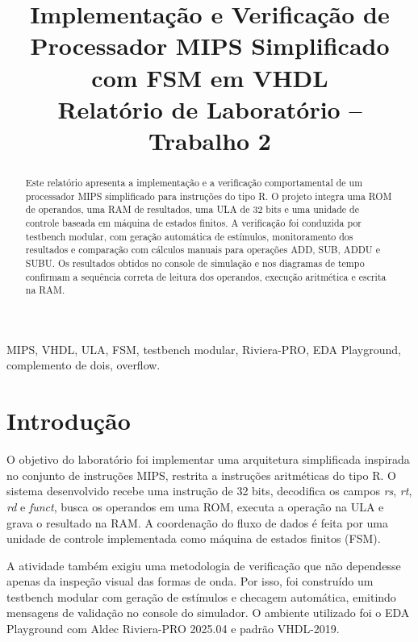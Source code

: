\documentclass[conference]{IEEEtran}
\begin{document}
\title{Implementação e Verificação de Processador MIPS Simplificado com FSM em VHDL\\
{\footnotesize Relatório de Laboratório -- Trabalho 2}}

\author{
}

\maketitle

\begin{abstract}
Este relatório apresenta a implementação e a verificação comportamental de um processador MIPS simplificado para instruções do tipo R. O projeto integra uma ROM de operandos, uma RAM de resultados, uma ULA de 32 bits e uma unidade de controle baseada em máquina de estados finitos. A verificação foi conduzida por testbench modular, com geração automática de estímulos, monitoramento dos resultados e comparação com cálculos manuais para operações ADD, SUB, ADDU e SUBU. Os resultados obtidos no console de simulação e nos diagramas de tempo confirmam a sequência correta de leitura dos operandos, execução aritmética e escrita na RAM.
\end{abstract}

\begin{IEEEkeywords}
MIPS, VHDL, ULA, FSM, testbench modular, Riviera-PRO, EDA Playground, complemento de dois, overflow.
\end{IEEEkeywords}

\section{Introdução}
O objetivo do laboratório foi implementar uma arquitetura simplificada inspirada no conjunto de instruções MIPS, restrita a instruções aritméticas do tipo R. O sistema desenvolvido recebe uma instrução de 32 bits, decodifica os campos \textit{rs}, \textit{rt}, \textit{rd} e \textit{funct}, busca os operandos em uma ROM, executa a operação na ULA e grava o resultado na RAM. A coordenação do fluxo de dados é feita por uma unidade de controle implementada como máquina de estados finitos (FSM).

A atividade também exigiu uma metodologia de verificação que não dependesse apenas da inspeção visual das formas de onda. Por isso, foi construído um testbench modular com geração de estímulos e checagem automática, emitindo mensagens de validação no console do simulador. O ambiente utilizado foi o EDA Playground com Aldec Riviera-PRO 2025.04 e padrão VHDL-2019.
\end{document}
